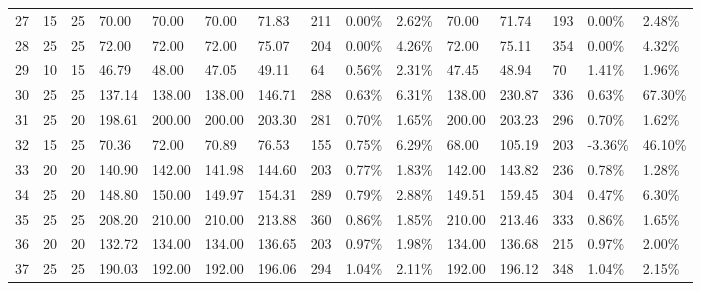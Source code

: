 \documentclass[
  a4paper,
,tablecaptionabove
]{scrartcl}
\numberwithin{equation}{section}
\begin{document}
\begin{longtable}{l|ll|ll|lllll|lllll}
  27 & 15                         & 25                         & 70.00                     & 70.00       & 70.00         & 71.83  & 211 & 0.00\%  & 2.62\% & 70.00  & 71.74  & 193 & 0.00\%  & 2.48\%  \\
  28 & 25                         & 25                         & 72.00                     & 72.00       & 72.00         & 75.07  & 204 & 0.00\%  & 4.26\% & 72.00  & 75.11  & 354 & 0.00\%  & 4.32\%  \\
  29 & 10                         & 15                         & 46.79                     & 48.00       & 47.05         & 49.11  & 64  & 0.56\%  & 2.31\% & 47.45  & 48.94  & 70  & 1.41\%  & 1.96\%  \\
  30 & 25                         & 25                         & 137.14                    & 138.00      & 138.00        & 146.71 & 288 & 0.63\%  & 6.31\% & 138.00 & 230.87 & 336 & 0.63\%  & 67.30\% \\
  31 & 25                         & 20                         & 198.61                    & 200.00      & 200.00        & 203.30 & 281 & 0.70\%  & 1.65\% & 200.00 & 203.23 & 296 & 0.70\%  & 1.62\%  \\
  32 & 15                         & 25                         & 70.36                     & 72.00       & 70.89         & 76.53  & 155 & 0.75\%  & 6.29\% & 68.00  & 105.19 & 203 & -3.36\% & 46.10\% \\
  33 & 20                         & 20                         & 140.90                    & 142.00      & 141.98        & 144.60 & 203 & 0.77\%  & 1.83\% & 142.00 & 143.82 & 236 & 0.78\%  & 1.28\%  \\
  34 & 25                         & 20                         & 148.80                    & 150.00      & 149.97        & 154.31 & 289 & 0.79\%  & 2.88\% & 149.51 & 159.45 & 304 & 0.47\%  & 6.30\%  \\
  35 & 25                         & 25                         & 208.20                    & 210.00      & 210.00        & 213.88 & 360 & 0.86\%  & 1.85\% & 210.00 & 213.46 & 333 & 0.86\%  & 1.65\%  \\
  36 & 20                         & 20                         & 132.72                    & 134.00      & 134.00        & 136.65 & 203 & 0.97\%  & 1.98\% & 134.00 & 136.68 & 215 & 0.97\%  & 2.00\%  \\
  37 & 25                         & 25                         & 190.03                    & 192.00      & 192.00        & 196.06 & 294 & 1.04\%  & 2.11\% & 192.00 & 196.12 & 348 & 1.04\%  & 2.15\%  \\

\end{longtable}
\end{document}
